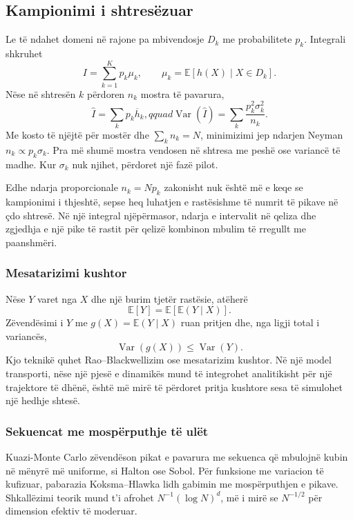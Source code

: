 \documentclass[11pt,oneside,openany]{book}
\newcommand{\E}{\mathbb{E}}
\newcommand{\Var}{\operatorname{Var}}
\begin{document}


\subsection{Kampionimi i shtresëzuar}
Le të ndahet domeni në rajone pa mbivendosje $D_k$ me probabilitete $p_k$. Integrali shkruhet
\begin{equation}
 I=\sum_{k=1}^{K}p_k\mu_k,
 \qquad \mu_k=\E[h(X)\mid X\in D_k].
\end{equation}
Nëse në shtresën $k$ përdoren $n_k$ mostra të pavarura,
\begin{equation}
 \widehat I=\sum_kp_k\overline h_k,qquad
 \Var(\widehat I)=\sum_k\frac{p_k^2\sigma_k^2}{n_k}.
\end{equation}
Me kosto të njëjtë për mostër dhe $\sum_kn_k=N$, minimizimi jep ndarjen Neyman $n_k\propto p_k\sigma_k$. Pra më shumë mostra vendosen në shtresa me peshë ose variancë të madhe. Kur $\sigma_k$ nuk njihet, përdoret një fazë pilot.

Edhe ndarja proporcionale $n_k=Np_k$ zakonisht nuk është më e keqe se kampionimi i thjeshtë, sepse heq luhatjen e rastësishme të numrit të pikave në çdo shtresë. Në një integral njëpërmasor, ndarja e intervalit në qeliza dhe zgjedhja e një pike të rastit për qelizë kombinon mbulim të rregullt me paanshmëri.

\subsubsection{Mesatarizimi kushtor}
Nëse $Y$ varet nga $X$ dhe një burim tjetër rastësie, atëherë
\begin{equation}
 \E[Y]=\E[\E(Y\mid X)].
\end{equation}
Zëvendësimi i $Y$ me $g(X)=\E(Y\mid X)$ ruan pritjen dhe, nga ligji total i variancës,
\begin{equation}
 \Var(g(X))\le\Var(Y).
\end{equation}
Kjo teknikë quhet Rao--Blackwellizim ose mesatarizim kushtor. Në një model transporti, nëse një pjesë e dinamikës mund të integrohet analitikisht për një trajektore të dhënë, është më mirë të përdoret pritja kushtore sesa të simulohet një hedhje shtesë.

\subsubsection{Sekuencat me mospërputhje të ulët}
Kuazi-Monte Carlo zëvendëson pikat e pavarura me sekuenca që mbulojnë kubin në mënyrë më uniforme, si Halton ose Sobol. Për funksione me variacion të kufizuar, pabarazia Koksma--Hlawka lidh gabimin me mospërputhjen e pikave. Shkallëzimi teorik mund t'i afrohet $N^{-1}(\log N)^d$, më i mirë se $N^{-1/2}$ për dimension efektiv të moderuar.
\end{document}
